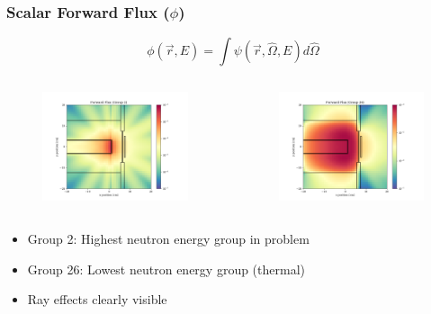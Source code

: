 \documentclass[t]{beamer}
\begin{document}
\begin{frame}
  \frametitle{Scalar Forward Flux ($\phi$)}
  \vskip-0.25in
  \begin{equation}
    \phi\left(\vec{r},E\right) = \int\psi\left(\vec{r},\hat{\Omega},E\right)d\hat{\Omega}
  \end{equation}
  \vskip-0.25in
  \begin{columns}
    \begin{figure}
      \includegraphics[trim={0.7in 0.15in 1.05in 0.4in},clip,scale=0.36]{images/scalar_flux_fwd_g02.png}
    \end{figure}
    \begin{figure}
      \includegraphics[trim={0.7in 0.15in 1.05in 0.4in},clip,scale=0.36]{images/scalar_flux_fwd_g26.png}
    \end{figure}
  \end{columns}
  \begin{itemize}
    \item Group 2: Highest neutron energy group in problem
    \item Group 26: Lowest neutron energy group (thermal)
    \item Ray effects clearly visible
  \end{itemize}
\end{frame}
\end{document}
